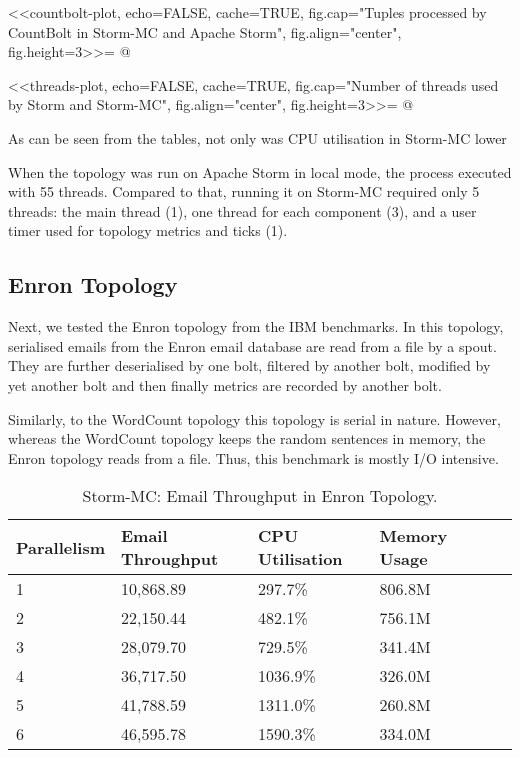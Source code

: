 <<countbolt-plot, echo=FALSE, cache=TRUE, fig.cap="Tuples processed by CountBolt in Storm-MC and Apache Storm", fig.align="center", fig.height=3>>=
@



<<threads-plot, echo=FALSE, cache=TRUE, fig.cap="Number of threads used by Storm and Storm-MC", fig.align="center", fig.height=3>>=
@

As can be seen from the tables, not only was CPU utilisation in Storm-MC lower 

When the topology was run on Apache Storm in local mode, the process executed with 55 threads. Compared to that, running it on Storm-MC required only 5 threads: the main thread (1), one thread for each component (3), and a user timer used for topology metrics and ticks (1).

\subsection{Enron Topology}

Next, we tested the Enron topology from the IBM benchmarks. In this topology, serialised emails from the Enron email database are read from a file by a spout. They are further deserialised by one bolt, filtered by another bolt, modified by yet another bolt and then finally metrics are recorded by another bolt.

Similarly, to the WordCount topology this topology is serial in nature. However, whereas the WordCount topology keeps the random sentences in memory, the Enron topology reads from a file. Thus, this benchmark is mostly I/O intensive.


\medskip
\begin{table}[!htb]
\begin{adjustwidth}{-0.5in}{-0.5in}
\centering
\small
\begin{tabular}{@{}llllll@{}}
    {Parallelism} & {Email Throughput} & {CPU Utilisation} & {Memory Usage} \\ \toprule
    1 & {10,868.89} & {297.7\%} & {806.8M} \\
    2 & {22,150.44} & {482.1\%} & {756.1M} \\
    3 & {28,079.70} & {729.5\%} & {341.4M} \\
    4 & {36,717.50} & {1036.9\%} & {326.0M} \\
    5 & {41,788.59} & {1311.0\%} & {260.8M} \\
    6 & {46,595.78} & {1590.3\%} & {334.0M} \\
\end{tabular}
\caption{Storm-MC: Email Throughput in Enron Topology.}
\end{adjustwidth}
\label{table:storm_mc_enron}
\end{table}
\medskip	



